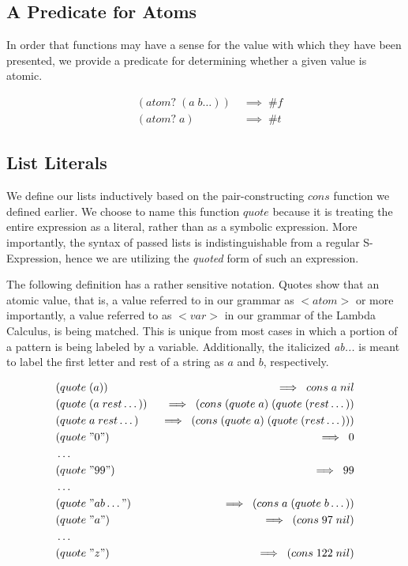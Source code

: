\subsection{A Predicate for Atoms}
In order that functions may have a sense for the value with which they have been 
presented, we provide a predicate for determining whether a given value is atomic.

\begin{figure}[ht]
\caption{}\label{scheme}
\begin{align*}
& (atom? \; (a \; b\dots)) \; &\implies \; \#f
\\& (atom? \; a) \; &\implies \; \#t
\end{align*}
\end{figure}

\subsection{List Literals}
We define our lists inductively based on the pair-constructing $cons$ function we 
defined earlier. We choose to name this function $quote$ because it is treating 
the entire expression as a literal, rather than as a symbolic expression. More 
importantly, the syntax of passed lists is indistinguishable from a regular 
S-Expression, hence we are utilizing the \emph{quoted} form of such an expression.

The following definition has a rather sensitive notation. Quotes show that an 
atomic value, that is, a value referred to in our grammar as $<atom>$ or more 
importantly, a value referred to as $<var>$ in our grammar of the Lambda Calculus, 
is being matched. This is unique from most cases in which a portion of a pattern 
is being labeled by a variable. Additionally, the italicized \emph{ab...} is meant to 
label the first letter and rest of a string as $a$ and $b$, respectively.

\begin{figure}[ht]
\caption{}\label{scheme}
\begin{align*}
& (quote \; (a)) \; &\implies \; cons \; a \; nil
\\& (quote \; (a \; rest\dots)) \; &\implies \; (cons \; (quote \; a) \; (quote \; (rest\dots))
\\& (quote \; a \; rest\dots) \; &\implies \; (cons \; (quote \; a) \; (quote \; (rest\dots)))
\\& (quote \; "0") \; &\implies \; 0
\\& \dots
\\& (quote \; "99") \; &\implies \; 99
\\& \dots
\\& (quote \; "ab\dots") \; &\implies \; (cons \; a \; (quote \; b\dots))
\\& (quote \; "a") \; &\implies \; (cons \; 97 \; nil)
\\& \dots
\\& (quote \; "z") \; &\implies \; (cons \; 122 \; nil)
\end{align*}
\end{figure}


